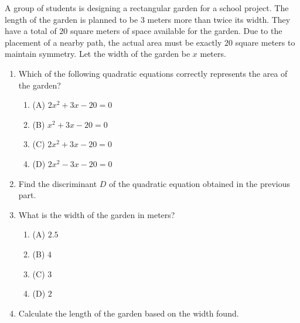 \documentclass[12pt,a4paper]{exam}
\begin{document}
\begin{questions}
\question[4] A group of students is designing a rectangular garden for a school project. The length of the garden is planned to be $3$ meters more than twice its width. They have a total of $20$ square meters of space available for the garden. Due to the placement of a nearby path, the actual area must be exactly $20$ square meters to maintain symmetry. Let the width of the garden be $x$ meters.
\vspace{0.2cm}
\begin{enumerate}[label=(\roman*)]
  \item Which of the following quadratic equations correctly represents the area of the garden?
  \begin{enumerate}[label=(\Alph*)]
    \item (A) $2x^2 + 3x - 20 = 0$
    \item (B) $x^2 + 3x - 20 = 0$
    \item (C) $2x^2 + 3x - 20 = 0$
    \item (D) $2x^2 - 3x - 20 = 0$
  \end{enumerate}
  \item Find the discriminant $D$ of the quadratic equation obtained in the previous part.
  \item What is the width of the garden in meters?
  \begin{enumerate}[label=(\Alph*)]
    \item (A) $2.5$
    \item (B) $4$
    \item (C) $3$
    \item (D) $2$
  \end{enumerate}
  \item Calculate the length of the garden based on the width found.
\end{enumerate}
\vspace{0.15cm}


\end{questions}
\end{document}
